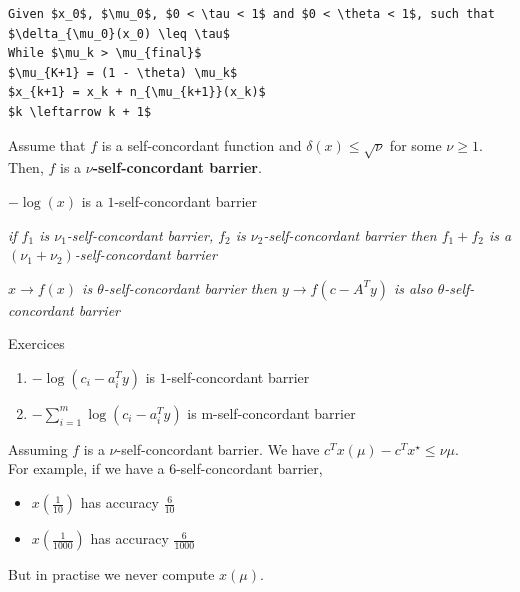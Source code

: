 \begin{lstlisting}[mathescape,caption=Interior Point Algorithm]
Given $x_0$, $\mu_0$, $0 < \tau < 1$ and $0 < \theta < 1$, such that $\delta_{\mu_0}(x_0) \leq \tau$
While $\mu_k > \mu_{final}$
$\mu_{K+1} = (1 - \theta) \mu_k$ 
$x_{k+1} = x_k + n_{\mu_{k+1}}(x_k)$
$k \leftarrow k + 1$
\end{lstlisting}


\begin{definition} Assume that $f$ is a self-concordant function and $\delta (x) \leq \sqrt{\nu}$ for some $\nu \geq 1$. Then, $f$ is a \textbf{$\nu$-self-concordant barrier}.
\end{definition}

\begin{example}
\begin{leftbar}
$- \log (x)$ is a $1$-self-concordant barrier 
\end{leftbar}
\end{example}

\begin{property}
\textit{if $f_1$ is $\nu_1$-self-concordant barrier, $f_2$ is $\nu_2$-self-concordant barrier then $f_1 + f_2$ is a $(\nu_1 + \nu_2)$-self-concordant barrier}
\end{property}
 
\begin{property}
\textit{$x \rightarrow f(x)$ is $\theta$-self-concordant barrier then $y \rightarrow f(c - A^T y)$ is also $\theta$-self-concordant barrier}
\end{property}

\begin{example}
\begin{leftbar}
Exercices 
\begin{enumerate}
\item $- \log (c_i - a_i^T y)$ is $1$-self-concordant barrier
\item $- \sum_{i=1}^m \log (c_i - a_i^T y)$ is m-self-concordant barrier
\end{enumerate}
\end{leftbar}
\end{example}

Assuming $f$ is a $\nu$-self-concordant barrier. We have $c^T x(\mu) - c^T x^{\star} \leq \nu\mu$.\\
For example, if we have a 6-self-concordant barrier,
\begin{itemize}
\item $x(\frac{1}{10})$ has accuracy $\frac{6}{10}$
\item $x(\frac{1}{1000})$ has accuracy $\frac{6}{1000}$
\end{itemize}
But in practise we never compute $x(\mu)$.\\

